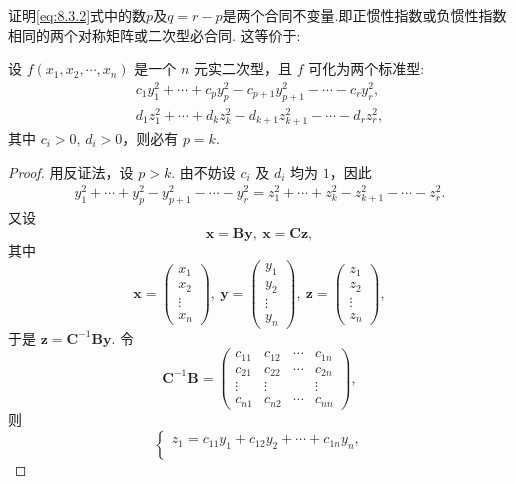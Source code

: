 \documentclass[../../main.tex]{subfiles}%
\begin{document}
\begin{theorem}[惯性定理]\label{theorem:惯性定理}
证明\eqref{eq:8.3.2}式中的数$p$及$q=r-p$是两个合同不变量.即正惯性指数或负惯性指数相同的两个对称矩阵或二次型必合同.
这等价于:

设 $f(x_1,x_2,\cdots,x_n)$ 是一个 $n$ 元实二次型，且 $f$ 可化为两个标准型:
\begin{align*}
c_1y_1^2+\cdots + c_py_p^2 - c_{p + 1}y_{p + 1}^2 - \cdots - c_ry_r^2,\\
d_1z_1^2+\cdots + d_kz_k^2 - d_{k + 1}z_{k + 1}^2 - \cdots - d_rz_r^2,
\end{align*}
其中 $c_i>0$, $d_i>0$，则必有 $p = k$.
\end{theorem}
\begin{proof}
用反证法，设 $p>k$. 由不妨设 $c_i$ 及 $d_i$ 均为 $1$，因此
\begin{align}
y_1^2+\cdots + y_p^2 - y_{p + 1}^2 - \cdots - y_r^2 = z_1^2+\cdots + z_k^2 - z_{k + 1}^2 - \cdots - z_r^2.\label{eq:8.3.4}
\end{align}
又设
\[
\boldsymbol{x}=\boldsymbol{B}\boldsymbol{y},\ \boldsymbol{x}=\boldsymbol{C}\boldsymbol{z},
\]
其中
\[
\boldsymbol{x}=\begin{pmatrix}
x_1\\
x_2\\
\vdots\\
x_n
\end{pmatrix},\ \boldsymbol{y}=\begin{pmatrix}
y_1\\
y_2\\
\vdots\\
y_n
\end{pmatrix},\ \boldsymbol{z}=\begin{pmatrix}
z_1\\
z_2\\
\vdots\\
z_n
\end{pmatrix},
\]
于是 $\boldsymbol{z}=\boldsymbol{C}^{-1}\boldsymbol{B}\boldsymbol{y}$. 令
\[
\boldsymbol{C}^{-1}\boldsymbol{B}=\begin{pmatrix}
c_{11} & c_{12} & \cdots & c_{1n}\\
c_{21} & c_{22} & \cdots & c_{2n}\\
\vdots & \vdots & & \vdots\\
c_{n1} & c_{n2} & \cdots & c_{nn}
\end{pmatrix},
\]
则
\[
\begin{cases}
z_1 = c_{11}y_1 + c_{12}y_2 + \cdots + c_{1n}y_n,\\

\end{cases}\]
\end{proof}
\end{document}
